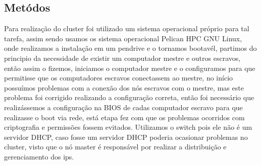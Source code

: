 \documentclass[12pt]{article}
\begin{document}
\begin{table}[]
\centering
\caption{Configuração das máquinas utilizadas no cluster}
\label{tab:computersLabor}
\end{table}


\subsection{Metódos}
    Para realização do cluster foi utilizado um sistema operacional próprio para tal tarefa, 
    assim sendo usamos os sistema operacional Pelican HPC GNU Linux, onde realizamos a instalação
    em um pendrive e o tornamos bootavél, partimos do principio da necessidade de existir um computador
    mestre e outros escravos, então assim o fizemos, iniciamos o computador mestre e o configuramos para que
    permitisse que os computadores escravos conectassem ao mestre, no início possuímos problemas com a conexão dos 
    nós escravos com o mestre, mas este problema foi corrigido realizando a configuração correta, então foi necessário 
    que realizássemos a configuração na BIOS de cadas computador escravo para que realizasse o boot via rede, está etapa fez com que 
    os problemas ocorridos com criptografia e permissões fossem evitados. Utilizamos o switch pois ele não é um servidor DHCP, caso
    fosse um servidor DHCP poderia ocasionar problemas no cluster, visto que o nó master é responsável por realizar a distribuição e gerenciamento dos ips.
   
\end{document}
